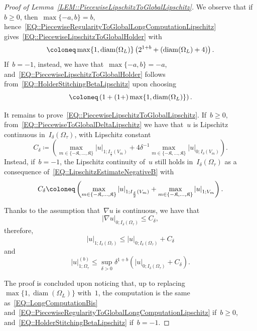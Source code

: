 \documentclass[12pt,a4paper]{amsart}
\makeatletter
\numberwithin{equation}{section}
\theoremstyle{definition}
\theoremstyle{remark}
\newcommand{\abs}[1]{\left\lvert#1\right\rvert}
\renewcommand{\leq}{\leqslant}
\renewcommand{\geq}{\geqslant}
\newcommand{\const}[1]{%
  \csname const@#1\endcsname%
}
\newcommand{\constapp}[1]{%
  \csname constapp@#1\endcsname%
}
\makeatother
\begin{document}
\begin{appendix}
\begin{proof}[Proof of Lemma~\ref{LEM::PiecewiseLipschitzToGlobalLipschitz}]
    We observe that if~$b \geq 0$, then~$\max\{-a,b\} = b$, hence~\eqref{EQ::PiecewiseRegularityToGlobalLongComputationLipschitz} gives~\eqref{EQ::PiecewiseLipschitzToGlobalHolder} with
    \[\const{CONST::PiecewiseLipschitzToGlobalLipschitz} \coloneq \max\{1,\operatorname{diam}(\Omega_L)\} \left(2^{1+b} + \constapp{CONST::HolderEmbeddingA}\left(\operatorname{diam}(\Omega_L) + 4\right)\right).\]
    If~$b = -1$, instead, we have that~$\max\{-a,b\} = -a$, and~\eqref{EQ::PiecewiseLipschitzToGlobalHolder} follows from~\eqref{EQ::HolderStitchingBetaLipschitz} upon choosing
    \[\const{CONST::PiecewiseLipschitzToGlobalLipschitz} \coloneq \left(1+(1+\constapp{CONST::Quasiconvexity}) \max\{1,\operatorname{diam}(\Omega_L)\}\right).\]

    It remains to prove~\eqref{EQ::PiecewiseLipschitzToGlobalLipschitz}. If~$b \geq 0$, from~\eqref{EQ::PiecewiseToGlobalDeltaLipschitz} we have that~$u$ is Lipschitz continuous in~$I_\delta(\Omega_\tau)$, with Lipschitz constant
    \[C_{\delta} \coloneq \left(\max_{m \in \{-\mathfrak{K},\dots,\mathfrak{K}\}} \abs{u}_{1; I_{\frac{\delta}{2}}(V_m)} + 4{\delta^{-1}}\max_{m \in \{-\mathfrak{K},\dots,\mathfrak{K}\}}\abs{u}_{0;I_\delta(V_m)}\right).\]
    Instead, if~$b = -1$, the Lipschitz continuity of~$u$ still holds in~$I_\delta(\Omega_\tau)$ as a consequence of~\eqref{EQ::LipschitzEstimateNegativeB} with
    \[C_{\delta} \coloneq \left(\max_{m \in \{-\mathfrak{K},\dots,\mathfrak{K}\}} \abs{u}_{1; I_{\frac{\delta}{2}}(V_m)} + \constapp{CONST::Quasiconvexity} \max_{m \in \{-\mathfrak{K},\dots,\mathfrak{K}\}}\abs{u}_{1; V_{m}}\right).\]

    Thanks to the assumption that~$\nabla u$ is continuous, we have that
    \begin{equation}
        \abs{\nabla u}_{0; I_\delta(\Omega_\tau)} \leq C_{\delta},
    \end{equation}
    therefore,
    \begin{equation}
        \abs{u}_{1; I_\delta(\Omega_\tau)} \leq \abs{u}_{0; I_\delta(\Omega_\tau)} + C_\delta
    \end{equation}
    and
    \begin{equation}
        \abs{u}_{1; \Omega_\tau}^{(b)} \leq \sup_{\delta > 0} \delta^{1+b} (\abs{u}_{0; I_\delta(\Omega_\tau)}+C_\delta).
    \end{equation}

    The proof is concluded upon noticing that, up to replacing~$\max\{1,\operatorname{diam}(\Omega_L)\}$ with~$1$, the computation is the same as~\eqref{EQ::LongComputationBis} and~\eqref{EQ::PiecewiseRegularityToGlobalLongComputationLipschitz} if~$b \geq 0$, and~\eqref{EQ::HolderStitchingBetaLipschitz} if~$b = -1$.
\end{proof}
\end{appendix}
{
 
}
\end{document}
